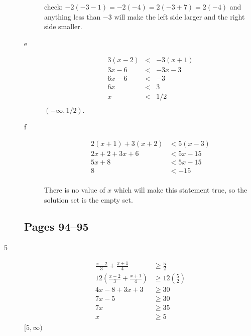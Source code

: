 \documentclass[letterpaper]{exam}
\begin{document}
\begin{description}
\begin{description}
      check: \( -2(-3 - 1) = -2(-4) = 2(-3 + 7) = 2(-4)\) and anything less than $-3$ will make the left side larger and the right side smaller.

        \item[e]
        \begin{align*}
          3(x - 2) &<& -3(x + 1) \\
          3x - 6 &<& -3x - 3 \\
          6x - 6 &<& - 3 \\
          6x &<& 3 \\
          x &<& 1/2 \\
        \end{align*}
      $\boxed{ (-\infty, 1/2) }$.

      \item[f]
        \begin{align*}
          2(x + 1) + 3(x + 2) & < 5(x - 3) \\
          2x + 2 + 3x + 6     & < 5x - 15 \\
          5x + 8              & < 5x - 15 \\
          8                   & < -15 \\
        \end{align*}

        There is no value of $x$ which will make this statement true, so the solution set is the empty set.

        \end{description}

      \subsection{Pages 94--95} 

      \item[5]
        \begin{align*}
          \frac{x-2}{3} + \frac{x+1}{4}     & \geq \frac{5}{2} \\
          12(\frac{x-2}{3} + \frac{x+1}{4}) & \geq 12(\frac{5}{2}) \\
          4x - 8 + 3x + 3                   & \geq 30 \\
          7x - 5                            & \geq 30 \\
          7x                                & \geq 35 \\
          x                                 & \geq 5 \\
        \end{align*}
        $\boxed{ [5, \infty) }$


\end{description}
\end{document}

